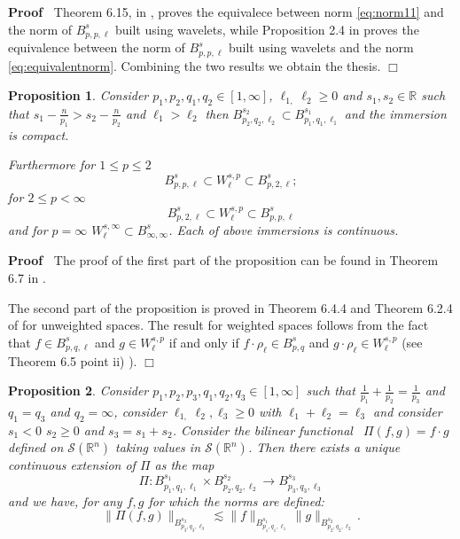 \documentclass[a4paper,10pt]{article}
\newenvironment{proof}{\noindent\textbf{Proof\ }}{\hspace*{\fill}$\Box$\medskip}
\newtheorem{proposition}{Proposition}
{\theorembodyfont{\rmfamily}\newtheorem{remark}{Remark}}
\begin{document}
\begin{proof}
  Theorem 6.15, in {\cite{Triebel2006}}, proves the equivalece between norm
  {\eqref{eq:norm11}} and the norm of $B^s_{p, p, \ell}$ built using wavelets,
  while Proposition 2.4 in {\cite{HaiLabb2017}} proves the equivalence between
  the norm of $B^s_{p, p, \ell}$ built using wavelets and the norm
  {\eqref{eq:equivalentnorm}}. Combining the two results we obtain the thesis.
\end{proof}

\begin{proposition}
  \label{proposition_inclusion}Consider $p_1, p_2, q_1, q_2 \in [1, \infty]$,
  $\ell_{1,} \ell_2 \geq 0$ and $s_1, s_2 \in \mathbb{R}$ such that $s_1 -
  \frac{n}{p_1} > s_2 - \frac{n}{p_2}$ and $\ell_1 > \ell_2$ then
  $B^{s_2}_{p_2, q_2, \ell_2} \subset B^{s_1}_{p_1, q_1, \ell_1}$ and the
  immersion is compact.
  
  Furthermore for $1 \leq p \leq 2$
  \[ B^s_{p, p, \ell} \subset W^{s, p}_{\ell} \subset B^s_{p, 2, \ell} ; \]
  for $2 \leq p < \infty$
  \[ B^s_{p, 2, \ell} \subset W^{s, p}_{\ell} \subset B^s_{p, p, \ell} \]
  and for $p = \infty$ $W^{s, \infty}_{\ell} \subset B^s_{\infty, \infty}$.
  Each of above immersions is continuous. 
\end{proposition}

\begin{proof}
  The proof of the first part of the proposition can be found in Theorem 6.7
  in {\cite{Triebel2006}}.
  
  The second part of the proposition is proved in Theorem 6.4.4 and Theorem
  6.2.4 of {\cite{Joran1976}} for unweighted spaces. The result for weighted
  spaces follows from the fact that $f \in B^s_{p, q, \ell}$ and $g \in W^{s,
  p}_{\ell}$ if and only if $f \cdot \rho_{\ell} \in B^s_{p, q}$ and $g \cdot
  \rho_{\ell} \in W^{s, p}_{\ell}$ (see {\cite{Triebel2006}} Theorem 6.5 point
  ii) ). 
\end{proof}

\begin{proposition}
  \label{propisition_product}Consider $p_1, p_2, p_3, q_1, q_2, q_3 \in [1,
  \infty]$ such that $\frac{1}{p_1} + \frac{1}{p_2} = \frac{1}{p_3}$ and $q_1
  = q_3$ and $q_2 = \infty$, consider $\ell_{1,} \ell_2, \ell_3 \geq 0$ with
  $\ell_1 + \ell_2 = \ell_3$ and consider $s_1 < 0$ $s_2 \geq 0$ and $s_3 =
  s_1 + s_2$. Consider the bilinear functional \ $\Pi (f, g) = f \cdot g$
  defined on $\mathcal{S} (\mathbb{R}^n)$ taking values in $\mathcal{S}
  (\mathbb{R}^n)$. Then there exists a unique continuous extension of $\Pi$ as
  the map
  \[ \Pi : B^{s_1}_{p_1, q_1, \ell_1} \times B^{s_2}_{p_2, q_2, \ell_2}
     \rightarrow B^{s_3}_{p_3, q_3, \ell_3} \]
  and we have, for any $f, g$ for which the norms are defined:
  \[ \| \Pi (f, g) \|_{B^{s_3}_{p_3, q_3, \ell_3}} \lesssim \| f
     \|_{B^{s_1}_{p_1, q_1, \ell_1}} \| g \|_{B^{s_2}_{p_2, q_2, \ell_2}} . \]
\end{proposition}
\end{document}
